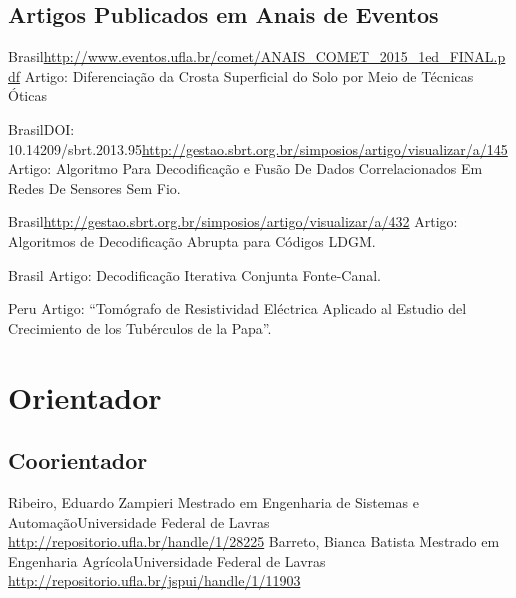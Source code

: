 \documentclass[11pt,a4paper,sans]{moderncv} %
\begin{document}
\subsection{Artigos Publicados em Anais de Eventos}

	      {Brasil}{}{\url{http://www.eventos.ufla.br/comet/ANAIS\_COMET\_2015\_1ed\_FINAL.pdf}}
	      {Artigo: Diferenciação da Crosta Superficial do Solo por Meio de Técnicas Óticas}

	      {Brasil}{DOI: 10.14209/sbrt.2013.95}{\url{http://gestao.sbrt.org.br/simposios/artigo/visualizar/a/145}}
	      {Artigo: Algoritmo Para Decodificação e Fusão De Dados Correlacionados Em Redes De Sensores Sem Fio.}

	      {Brasil}{}{\url{http://gestao.sbrt.org.br/simposios/artigo/visualizar/a/432}}
	      {Artigo: Algoritmos de Decodificação Abrupta para Códigos LDGM.}

	      {Brasil}{}{}%
	      {Artigo: Decodificação Iterativa Conjunta Fonte-Canal.}

	      {Peru}{}{}
	      {Artigo: ``Tomógrafo de Resistividad Eléctrica Aplicado al Estudio del Crecimiento de los Tubérculos de la Papa''.}


	       
\section{Orientador}
\subsection{Coorientador}
			{Ribeiro, Eduardo Zampieri}
			{Mestrado em Engenharia de Sistemas e Automação}{Universidade Federal de Lavras}
			{\url{http://repositorio.ufla.br/handle/1/28225}}
			{Barreto, Bianca Batista}
			{Mestrado em Engenharia Agrícola}{Universidade Federal de Lavras}
			{\url{http://repositorio.ufla.br/jspui/handle/1/11903}}
\end{document}
